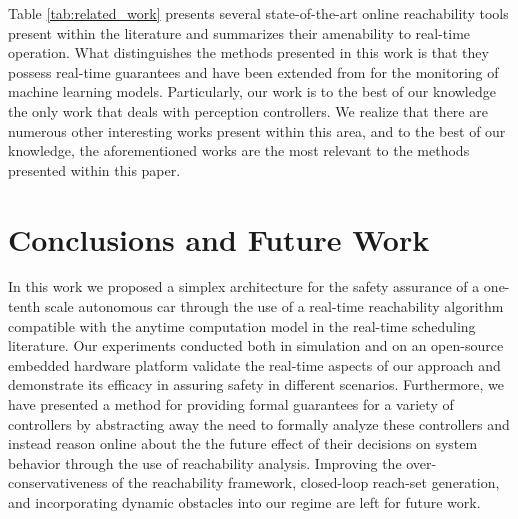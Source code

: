 \documentclass[manuscript,screen,review]{acmart}
\newcommand{\diego}[1]{\textcolor{purple}{\textbf{\underline{DM:}} #1}}
\begin{document}


Table \ref{tab:related_work} presents several state-of-the-art online reachability tools present within the literature and summarizes their amenability to real-time operation. What distinguishes the methods presented in this work is that they possess real-time guarantees and have been extended from \cite{Johnson2016} for the monitoring of machine learning models. Particularly, our work is to the best of our knowledge the only work that deals with perception controllers. We realize that there are numerous other interesting works present within this area, and to the best of our knowledge, the aforementioned works are the most relevant to the methods presented within this paper.   

\section{Conclusions and Future Work}

In this work we proposed a simplex architecture for the safety assurance of a one-tenth scale autonomous car through the use of a real-time reachability algorithm compatible with the anytime computation model in the real-time scheduling literature. Our experiments conducted both in simulation and on an open-source embedded hardware platform validate the real-time aspects of our approach and demonstrate its efficacy in assuring safety in different scenarios. Furthermore, we have presented a method for providing formal guarantees for a variety of controllers by abstracting away the need to formally analyze these controllers and instead reason online about the the future effect of their decisions on system behavior through the use of reachability analysis. Improving the over-conservativeness of the reachability framework,  closed-loop reach-set generation, and incorporating dynamic obstacles into our regime are left for future work.


\end{document}
